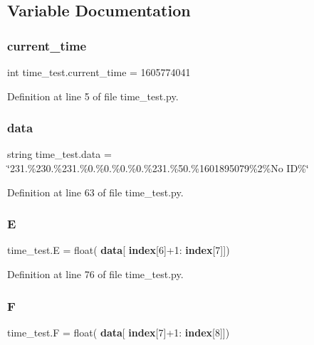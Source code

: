 \subsection{Variable Documentation}
\mbox{\label{namespacetime__test_af56e74993848ce788fe8bea9a670e300}} 
\subsubsection{current\+\_\+time}
{\footnotesize\ttfamily int time\+\_\+test.\+current\+\_\+time = 1605774041}



Definition at line 5 of file time\+\_\+test.\+py.

\mbox{\label{namespacetime__test_ac6750dcb0cb85d1b5f238759804f59fa}} 
\subsubsection{data}
{\footnotesize\ttfamily string time\+\_\+test.\+data = \char`\"{}231.\%230.\%231.\%0.\%0.\%0.\%0.\%231.\%50.\%1601895079\%2\%No ID\%\char`\"{}}



Definition at line 63 of file time\+\_\+test.\+py.

\mbox{\label{namespacetime__test_a2feb6117d7773c122cb3f325c60dd6d7}} 
\subsubsection{E}
{\footnotesize\ttfamily time\+\_\+test.\+E = float(\textbf{ data}[\textbf{ index}[6]+1\+:\textbf{ index}[7]])}



Definition at line 76 of file time\+\_\+test.\+py.

\mbox{\label{namespacetime__test_a599e109073477b1b4905939a6f6634ca}} 
\subsubsection{F}
{\footnotesize\ttfamily time\+\_\+test.\+F = float(\textbf{ data}[\textbf{ index}[7]+1\+:\textbf{ index}[8]])}



